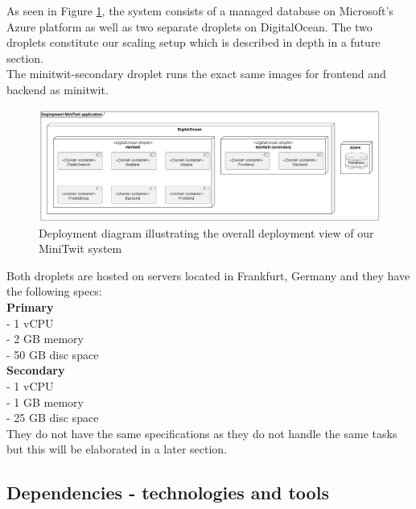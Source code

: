 As seen in Figure \ref{fig:DeploymentDiagram}, the system consists of a managed database on Microsoft's Azure platform as well as two separate droplets on DigitalOcean. The two droplets constitute our scaling setup which is described in depth in a future section. \\ The minitwit-secondary droplet runs the exact same images for frontend and backend as minitwit.
\begin{figure}[H]
 \centering
 \includegraphics[width = \textwidth]{images/deployment.png}
 \caption{Deployment diagram illustrating the overall deployment view of our MiniTwit system}
 \label{fig:DeploymentDiagram}
\end{figure}

\noindent
Both droplets are hosted on servers located in Frankfurt, Germany and they have the following specs: \\
\textbf{Primary} \\
- 1 vCPU \\
- 2 GB memory \\
- 50 GB disc space \\

\noindent
\textbf{Secondary} \\
- 1 vCPU \\
- 1 GB memory \\
- 25 GB disc space \\

They do not have the same specifications as they do not handle the same tasks but this will be elaborated in a later section.


\newpage
\subsection{Dependencies - technologies and tools}


